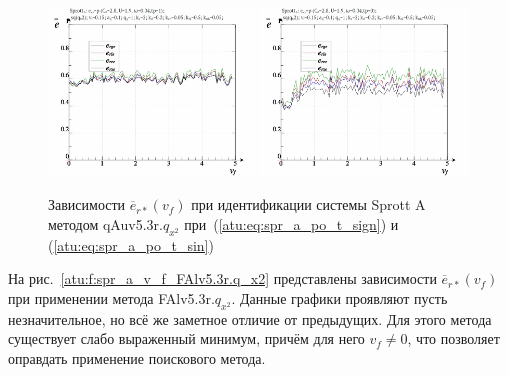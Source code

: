 \begin{figure}[h!]
  \centerline{
    \includegraphics[width=0.49\textwidth]{p/cha/spr_a/qAuv5.3r/sprott_a_qAuv5_3r_qx2-p_v_f_e_sign.png}
    \hfill
    \includegraphics[width=0.49\textwidth]{p/cha/spr_a/qAuv5.3r/sprott_a_qAuv5_3r_qx2-p_v_f_e_sin.png}
  }
  \caption{Зависимости $\overline{e}_{r*}(v_f)$ при идентификации системы Sprott A методом qAuv5.3r.$q_{x^2}$
   при~(\ref{atu:eq:spr_a_po_t_sign}) и (\ref{atu:eq:spr_a_po_t_sin})}
  \label{atu:f:spr_a_v_f_qAuv5.3r.q_x2}
\end{figure}

На рис.~\ref{atu:f:spr_a_v_f_FAlv5.3r.q_x2} представлены зависимости
$\overline{e}_{r*}(v_f)$ при применении метода FAlv5.3r.$q_{x^2}$.
Данные графики проявляют пусть незначительное,
но всё же заметное отличие от предыдущих.
Для этого метода существует слабо выраженный минимум,
причём для него $v_f \ne 0 $, что позволяет
оправдать применение поискового метода.

